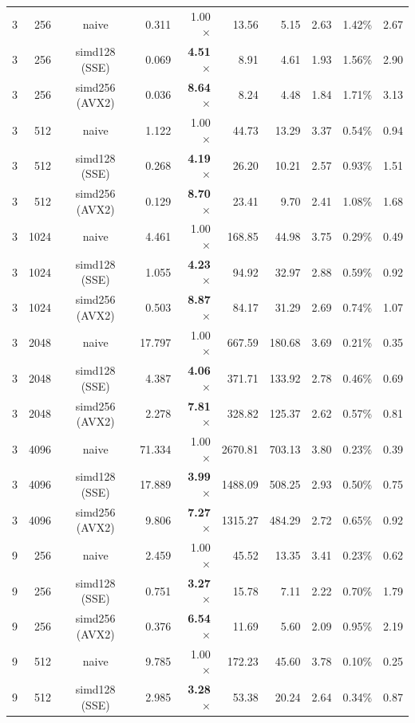 \documentclass[11pt,a4paper]{article}
\begin{document}
{\begin{longtable}{rrcrrrrrrr}
3 & 256 & naive & 0.311 & 1.00$\times$ & 13.56 & 5.15 & 2.63 & 1.42\% & 2.67 \\
3 & 256 & simd128 (SSE) & 0.069 & \textbf{4.51$\times$} & 8.91 & 4.61 & 1.93 & 1.56\% & 2.90 \\
3 & 256 & simd256 (AVX2) & 0.036 & \textbf{8.64$\times$} & 8.24 & 4.48 & 1.84 & 1.71\% & 3.13 \\
\midrule
3 & 512 & naive & 1.122 & 1.00$\times$ & 44.73 & 13.29 & 3.37 & 0.54\% & 0.94 \\
3 & 512 & simd128 (SSE) & 0.268 & \textbf{4.19$\times$} & 26.20 & 10.21 & 2.57 & 0.93\% & 1.51 \\
3 & 512 & simd256 (AVX2) & 0.129 & \textbf{8.70$\times$} & 23.41 & 9.70 & 2.41 & 1.08\% & 1.68 \\
\midrule
3 & 1024 & naive & 4.461 & 1.00$\times$ & 168.85 & 44.98 & 3.75 & 0.29\% & 0.49 \\
3 & 1024 & simd128 (SSE) & 1.055 & \textbf{4.23$\times$} & 94.92 & 32.97 & 2.88 & 0.59\% & 0.92 \\
3 & 1024 & simd256 (AVX2) & 0.503 & \textbf{8.87$\times$} & 84.17 & 31.29 & 2.69 & 0.74\% & 1.07 \\
\midrule
3 & 2048 & naive & 17.797 & 1.00$\times$ & 667.59 & 180.68 & 3.69 & 0.21\% & 0.35 \\
3 & 2048 & simd128 (SSE) & 4.387 & \textbf{4.06$\times$} & 371.71 & 133.92 & 2.78 & 0.46\% & 0.69 \\
3 & 2048 & simd256 (AVX2) & 2.278 & \textbf{7.81$\times$} & 328.82 & 125.37 & 2.62 & 0.57\% & 0.81 \\
\midrule
3 & 4096 & naive & 71.334 & 1.00$\times$ & 2670.81 & 703.13 & 3.80 & 0.23\% & 0.39 \\
3 & 4096 & simd128 (SSE) & 17.889 & \textbf{3.99$\times$} & 1488.09 & 508.25 & 2.93 & 0.50\% & 0.75 \\
3 & 4096 & simd256 (AVX2) & 9.806 & \textbf{7.27$\times$} & 1315.27 & 484.29 & 2.72 & 0.65\% & 0.92 \\
\midrule
9 & 256 & naive & 2.459 & 1.00$\times$ & 45.52 & 13.35 & 3.41 & 0.23\% & 0.62 \\
9 & 256 & simd128 (SSE) & 0.751 & \textbf{3.27$\times$} & 15.78 & 7.11 & 2.22 & 0.70\% & 1.79 \\
9 & 256 & simd256 (AVX2) & 0.376 & \textbf{6.54$\times$} & 11.69 & 5.60 & 2.09 & 0.95\% & 2.19 \\
\midrule
9 & 512 & naive & 9.785 & 1.00$\times$ & 172.23 & 45.60 & 3.78 & 0.10\% & 0.25 \\
9 & 512 & simd128 (SSE) & 2.985 & \textbf{3.28$\times$} & 53.38 & 20.24 & 2.64 & 0.34\% & 0.87 \\

\end{longtable}}
\end{document}

